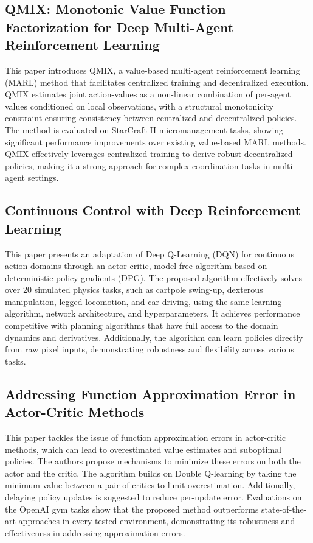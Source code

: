 \documentclass[journal]{IEEEtran}
\begin{document}
\subsection{QMIX: Monotonic Value Function Factorization for Deep Multi-Agent Reinforcement Learning}
This paper introduces QMIX, a value-based multi-agent reinforcement learning (MARL) method that facilitates centralized training and decentralized execution. QMIX estimates joint action-values as a non-linear combination of per-agent values conditioned on local observations, with a structural monotonicity constraint ensuring consistency between centralized and decentralized policies. The method is evaluated on StarCraft II micromanagement tasks, showing significant performance improvements over existing value-based MARL methods. QMIX effectively leverages centralized training to derive robust decentralized policies, making it a strong approach for complex coordination tasks in multi-agent settings.
\cite{rashid2018}

\subsection{Continuous Control with Deep Reinforcement Learning}
This paper presents an adaptation of Deep Q-Learning (DQN) for continuous action domains through an actor-critic, model-free algorithm based on deterministic policy gradients (DPG). The proposed algorithm effectively solves over 20 simulated physics tasks, such as cartpole swing-up, dexterous manipulation, legged locomotion, and car driving, using the same learning algorithm, network architecture, and hyperparameters. It achieves performance competitive with planning algorithms that have full access to the domain dynamics and derivatives. Additionally, the algorithm can learn policies directly from raw pixel inputs, demonstrating robustness and flexibility across various tasks.
\cite{lillicrap2019}

\subsection{Addressing Function Approximation Error in Actor-Critic Methods}
This paper tackles the issue of function approximation errors in actor-critic methods, which can lead to overestimated value estimates and suboptimal policies. The authors propose mechanisms to minimize these errors on both the actor and the critic. The algorithm builds on Double Q-learning by taking the minimum value between a pair of critics to limit overestimation. Additionally, delaying policy updates is suggested to reduce per-update error. Evaluations on the OpenAI gym tasks show that the proposed method outperforms state-of-the-art approaches in every tested environment, demonstrating its robustness and effectiveness in addressing approximation errors.
\cite{fujimoto2018}
\end{document}
